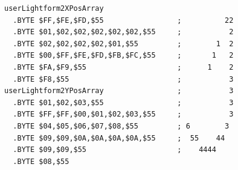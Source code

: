 \begin{minipage}[b]{0.48\linewidth}
\vspace{0.5cm}
\begin{lrbox}{\mybox}%
\hspace{1cm}
\begin{lstlisting}[basicstyle=\ttfamily\tiny,escapechar=\%]
userLightform2XPosArray
  .BYTE $FF,$FE,$FD,$55                 ;          22
  .BYTE $01,$02,$02,$02,$02,$02,$55     ;           2
  .BYTE $02,$02,$02,$02,$01,$55         ;        1  2
  .BYTE $00,$FF,$FE,$FD,$FB,$FC,$55     ;       1   2
  .BYTE $FA,$F9,$55                     ;      1    2
  .BYTE $F8,$55                         ;           3
userLightform2YPosArray                 ;           3
  .BYTE $01,$02,$03,$55                 ;           3
  .BYTE $FF,$FF,$00,$01,$02,$03,$55     ;           3
  .BYTE $04,$05,$06,$07,$08,$55         ; 6        3 
  .BYTE $09,$09,$0A,$0A,$0A,$0A,$55     ;  55    44  
  .BYTE $09,$09,$55                     ;    4444    
  .BYTE $08,$55
\end{lstlisting}
\end{lrbox}%
\scalebox{0.8}{\usebox{\mybox}}

\end{minipage}
%
%
